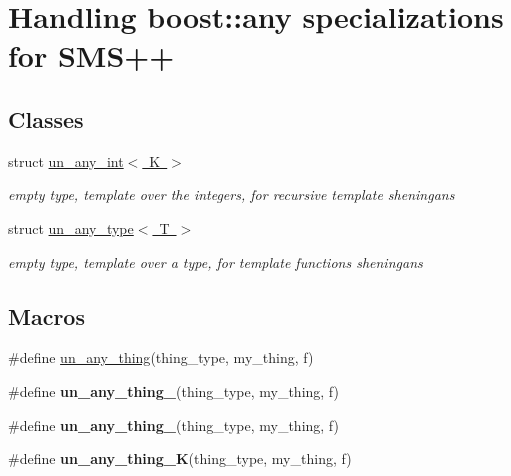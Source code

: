 \hypertarget{group__boost__any__stuff}{}\section{Handling boost\+:\+:any specializations for S\+M\+S++}
\label{group__boost__any__stuff}
\subsection*{Classes}
\begin{DoxyCompactItemize}
\item 
struct \mbox{\hyperlink{struct_s_m_spp__di__unipi__it_1_1un__any__int}{un\+\_\+any\+\_\+int$<$ K $>$}}
\begin{DoxyCompactList}\small\item\em empty type, template over the integers, for recursive template sheningans \end{DoxyCompactList}\item 
struct \mbox{\hyperlink{struct_s_m_spp__di__unipi__it_1_1un__any__type}{un\+\_\+any\+\_\+type$<$ T $>$}}
\begin{DoxyCompactList}\small\item\em empty type, template over a type, for template functions sheningans \end{DoxyCompactList}\end{DoxyCompactItemize}
\subsection*{Macros}
\begin{DoxyCompactItemize}
\item 
\#define \mbox{\hyperlink{group__boost__any__stuff_gab299af634bc1ca9be3a8d45a14560036}{un\+\_\+any\+\_\+thing}}(thing\+\_\+type,  my\+\_\+thing,  f)
\item 
\#define {\bfseries un\+\_\+any\+\_\+thing\+\_}(thing\+\_\+type,  my\+\_\+thing,  f)
\item 
\#define {\bfseries un\+\_\+any\+\_\+thing\+\_}(thing\+\_\+type,  my\+\_\+thing,  f)
\item 
\mbox{\label{group__boost__any__stuff_ga2b69a6f687631de2aecbe1e89c8a7f47}} 
\#define {\bfseries un\+\_\+any\+\_\+thing\+\_\+K}(thing\+\_\+type,  my\+\_\+thing,  f)
\end{DoxyCompactItemize}
